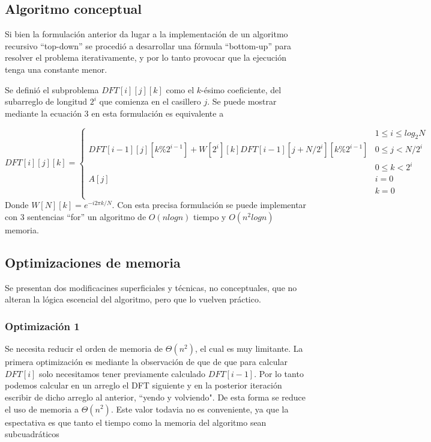 \documentclass[assd_tp2_main.tex]{subfiles}
\begin{document}
\subsection{Algoritmo conceptual}
Si bien la formulación anterior da lugar a la implementación de un algoritmo recursivo ``top-down'' se procedió a desarrollar una fórmula ``bottom-up'' para resolver el problema iterativamente, y por lo tanto provocar que la ejecución tenga una constante menor.

Se definió el subproblema $DFT[i][j][k]$ como el $k$-ésimo coeficiente, del subarreglo de longitud $2^i$ que comienza en el casillero $j$. Se puede mostrar mediante la ecuación 3 en esta formulación es equivalente a

\begin{equation}
	DFT[i][j][k] = \begin{cases}
		 & 1\leq i \leq log_2{N} \\ DFT[i-1][j][k\%2^{i-1}] + W[2^i][k] DFT[i-1][j+N/2^{i}][k\%2^{i-1}] & 0\leq j < N/2^i \\ & 0\leq k<2^i \\
		A[j] & i = 0 \\ & k = 0 \\
\end{cases}
\end{equation}
Donde $W[N][k]=e^{-i2\pi k / N}$.
Con esta precisa formulación se puede implementar con 3 sentencias ``for'' un algoritmo de $O(nlog n)$ tiempo y $O(n^2log n)$ memoria.

\subsection{Optimizaciones de memoria}
Se presentan dos modificacines superficiales y técnicas, no conceptuales, que no alteran la lógica escencial del algoritmo, pero que lo vuelven práctico.
\subsubsection{Optimización 1}
Se necesita reducir el orden de memoria de $\Theta(n^2)$, el cual es muy limitante. La primera optimización es mediante la observación de que de que para calcular $DFT[i]$ solo necesitamos tener previamente calculado $DFT[i-1]$. Por lo tanto podemos calcular en un arreglo el DFT siguiente y en la posterior iteración escribir de dicho arreglo al anterior, ``yendo y volviendo". De esta forma se reduce el uso de memoria a $\Theta(n^2)$. Este valor todavia no es conveniente, ya que la espectativa es que tanto el tiempo como la memoria del algoritmo sean subcuadráticos
\end{document}
